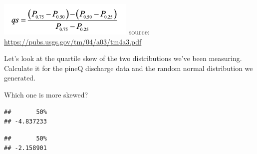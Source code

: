 \documentclass[
]{book}
\newenvironment{Shaded}{\begin{snugshade}}{\end{snugshade}}
\newcommand{\DecValTok}[1]{\textcolor[rgb]{0.00,0.00,0.81}{#1}}
\newcommand{\FunctionTok}[1]{\textcolor[rgb]{0.00,0.00,0.00}{#1}}
\newcommand{\NormalTok}[1]{#1}
\newcommand{\OtherTok}[1]{\textcolor[rgb]{0.56,0.35,0.01}{#1}}
\newcommand{\SpecialCharTok}[1]{\textcolor[rgb]{0.00,0.00,0.00}{#1}}
\begin{document}
\includegraphics{images/Screen Shot 2021-01-25 at 11.27.14 AM.png} source: \url{https://pubs.usgs.gov/tm/04/a03/tm4a3.pdf}

Let's look at the quartile skew of the two distributions we've been measuring. Calculate it for the pineQ discharge data and the random normal distribution we generated.

Which one is more skewed?

\begin{Shaded}
\end{Shaded}

\begin{verbatim}
##       50% 
## -4.837233
\end{verbatim}

\begin{Shaded}
\end{Shaded}

\begin{verbatim}
##       50% 
## -2.158901
\end{verbatim}
\end{document}
